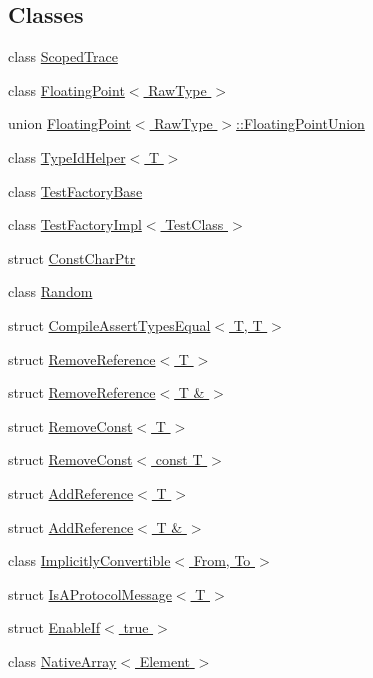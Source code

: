 \subsection*{\-Classes}
\begin{DoxyCompactItemize}
\item 
class \hyperlink{classtesting_1_1internal_1_1ScopedTrace}{\-Scoped\-Trace}
\item 
class \hyperlink{classtesting_1_1internal_1_1FloatingPoint}{\-Floating\-Point$<$ Raw\-Type $>$}
\item 
union \hyperlink{uniontesting_1_1internal_1_1FloatingPoint_1_1FloatingPointUnion}{\-Floating\-Point$<$ Raw\-Type $>$\-::\-Floating\-Point\-Union}
\item 
class \hyperlink{classtesting_1_1internal_1_1TypeIdHelper}{\-Type\-Id\-Helper$<$ T $>$}
\item 
class \hyperlink{classtesting_1_1internal_1_1TestFactoryBase}{\-Test\-Factory\-Base}
\item 
class \hyperlink{classtesting_1_1internal_1_1TestFactoryImpl}{\-Test\-Factory\-Impl$<$ Test\-Class $>$}
\item 
struct \hyperlink{structtesting_1_1internal_1_1ConstCharPtr}{\-Const\-Char\-Ptr}
\item 
class \hyperlink{classtesting_1_1internal_1_1Random}{\-Random}
\item 
struct \hyperlink{structtesting_1_1internal_1_1CompileAssertTypesEqual_3_01T_00_01T_01_4}{\-Compile\-Assert\-Types\-Equal$<$ T, T $>$}
\item 
struct \hyperlink{structtesting_1_1internal_1_1RemoveReference}{\-Remove\-Reference$<$ T $>$}
\item 
struct \hyperlink{structtesting_1_1internal_1_1RemoveReference_3_01T_01_6_01_4}{\-Remove\-Reference$<$ T \& $>$}
\item 
struct \hyperlink{structtesting_1_1internal_1_1RemoveConst}{\-Remove\-Const$<$ T $>$}
\item 
struct \hyperlink{structtesting_1_1internal_1_1RemoveConst_3_01const_01T_01_4}{\-Remove\-Const$<$ const T $>$}
\item 
struct \hyperlink{structtesting_1_1internal_1_1AddReference}{\-Add\-Reference$<$ T $>$}
\item 
struct \hyperlink{structtesting_1_1internal_1_1AddReference_3_01T_01_6_01_4}{\-Add\-Reference$<$ T \& $>$}
\item 
class \hyperlink{classtesting_1_1internal_1_1ImplicitlyConvertible}{\-Implicitly\-Convertible$<$ From, To $>$}
\item 
struct \hyperlink{structtesting_1_1internal_1_1IsAProtocolMessage}{\-Is\-A\-Protocol\-Message$<$ T $>$}
\item 
struct \hyperlink{structtesting_1_1internal_1_1EnableIf_3_01true_01_4}{\-Enable\-If$<$ true $>$}
\item 
class \hyperlink{classtesting_1_1internal_1_1NativeArray}{\-Native\-Array$<$ Element $>$}
\end{DoxyCompactItemize}
